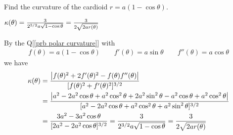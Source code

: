 


\begin{question}
Find the curvature of the cardioid $r=a(1-\cos\theta)$.
\end{question}


\begin{answer} 
$\kappa(\theta)=\frac{3}{2^{3/2}a\sqrt{1-\cos\theta}}
   =\frac{3}{2\sqrt{2ar(\theta)}}$
\end{answer}


\begin{solution}
By the Q[\ref{prb polar curvature}] with
\begin{align*}
f(\theta)  = a(1-\cos\theta)\qquad
f'(\theta) = a\sin\theta\qquad
f''(\theta) =a\cos\theta
\end{align*}
we have
\begin{align*}
\kappa(\theta)
&=\frac{\big|f(\theta)^2+2f'(\theta)^2-f(\theta)f''(\theta)\big|}
                     {[f(\theta)^2+f'(\theta)^2]^{3/2}}\\
&=\frac{\big|a^2-2a^2\cos\theta+a^2\cos^2\theta+2a^2\sin^2\theta-
                a^2\cos\theta+a^2\cos^2\theta\big|}
        {[a^2-2a^2\cos\theta+a^2\cos^2\theta+a^2\sin^2\theta]^{3/2}}\\
&=\frac{3a^2-3a^2\cos\theta}{[2a^2-2a^2\cos\theta]^{3/2}}
=\frac{3}{2^{3/2}a\sqrt{1-\cos\theta}}
=\frac{3}{2\sqrt{2ar(\theta)}}
\end{align*}
\end{solution}









